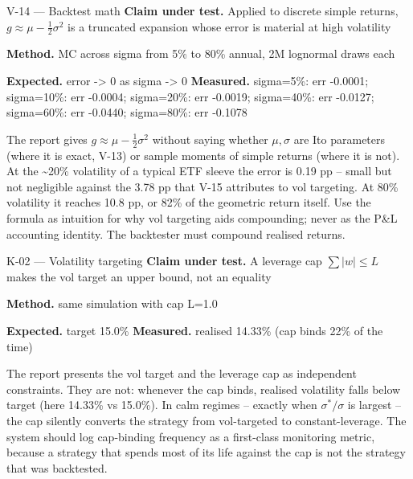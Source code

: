 \begin{caveat}{V-14 \; ---  Backtest math}
\textbf{Claim under test.} Applied to discrete simple returns, $g\approx\mu-\tfrac12\sigma^2$ is a truncated expansion whose error is material at high volatility

\textbf{Method.} MC across sigma from 5\% to 80\% annual, 2M lognormal draws each

\textbf{Expected.} error -> 0 as sigma -> 0 \quad \textbf{Measured.} sigma=5\%: err -0.0001; sigma=10\%: err -0.0004; sigma=20\%: err -0.0019; sigma=40\%: err -0.0127; sigma=60\%: err -0.0440; sigma=80\%: err -0.1078

The report gives $g\approx\mu-\tfrac12\sigma^2$ without saying whether $\mu,\sigma$ are Ito parameters (where it is exact, V-13) or sample moments of simple returns (where it is not). At the \textasciitilde{}20\% volatility of a typical ETF sleeve the error is 0.19 pp -- small but not negligible against the 3.78 pp that V-15 attributes to vol targeting. At 80\% volatility it reaches 10.8 pp, or 82\% of the geometric return itself. Use the formula as intuition for why vol targeting aids compounding; never as the P\&L accounting identity. The backtester must compound realised returns.
\end{caveat}

\begin{caveat}{K-02 \; ---  Volatility targeting}
\textbf{Claim under test.} A leverage cap $\sum|w|\le L$ makes the vol target an upper bound, not an equality

\textbf{Method.} same simulation with cap L=1.0

\textbf{Expected.} target 15.0\% \quad \textbf{Measured.} realised 14.33\% (cap binds 22\% of the time)

The report presents the vol target and the leverage cap as independent constraints. They are not: whenever the cap binds, realised volatility falls below target (here 14.33\% vs 15.0\%). In calm regimes -- exactly when $\sigma^*/\sigma$ is largest -- the cap silently converts the strategy from vol-targeted to constant-leverage. The system should log cap-binding frequency as a first-class monitoring metric, because a strategy that spends most of its life against the cap is not the strategy that was backtested.
\end{caveat}

